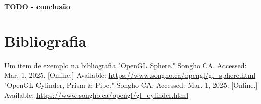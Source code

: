 \documentclass[12pt, a4paper]{article}
\begin{document}
\textbf{\color{red} TODO - conclusão}

\begingroup
\section{Bibliografia}
\renewcommand{\section}[2]{}

\begin{thebibliography}{9}
        \href{https://youtu.be/dQw4w9WgXcQ}{Um item de exemplo na bibliografia}
        "OpenGL Sphere."{} Songho CA. Accessed: Mar. 1, 2025. [Online.] Available:
        \url{https://www.songho.ca/opengl/gl_sphere.html}
        "OpenGL Cylinder, Prism \& Pipe."{} Songho CA. Accessed: Mar. 1, 2025. [Online.] Available:
        \url{https://www.songho.ca/opengl/gl_cylinder.html}
\end{thebibliography}
\endgroup
\end{document}
